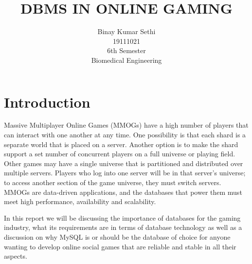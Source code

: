 \documentclass{article}
\begin{document}
\title{DBMS IN ONLINE GAMING}


\author{Binay Kumar Sethi \\
	19111021 \\
 	6th Semester \\ 
	Biomedical Engineering\\
	}

\maketitle 
 \hrulefill
 
 
 \section{Introduction}
 
Massive Multiplayer Online Games (MMOGs) have a high number of players that can interact with one another at any time. One possibility is that each shard is a separate world that is placed on a server. Another option is to make the shard support a set number of concurrent players on a full universe or playing field. Other games may have a single universe that is partitioned and distributed over multiple servers. Players who log into one server will be in that server's universe; to access another section of the game universe, they must switch servers.
MMOGs are data-driven applications, and the databases that power them must meet high performance, availability and scalability.

In this report we will be discussing the importance of databases for the gaming industry, what its requirements are in terms of database technology as well as a discussion on why MySQL is or should be the database of choice for anyone wanting to develop online social games that are reliable and stable in all their aspects.
 
 
 
 
 
 
 
 
 
 
 
 
 
 
 
 
 
 
 
 
 
 
 
 
 
 
 
 
\end{document}
